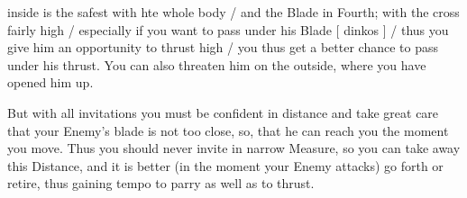 \newpage


\newpage



inside is the safest with hte whole body / and the Blade in Fourth;
with the cross fairly high / especially if you want to pass under his
Blade [ dinkos ] / thus you give him an
opportunity to thrust high / you thus get a better chance to pass
under his thrust. You can also threaten him on the outside, where you
have opened him up.


But with all invitations you must be confident in distance and take great
care that your Enemy's blade is not too close, so,  that he can reach you
the moment you move. Thus you should never invite in narrow Measure, so
you can take away this Distance, and it is better (in the moment your
Enemy attacks) go forth or retire, thus gaining tempo to parry as well
as to thrust.


